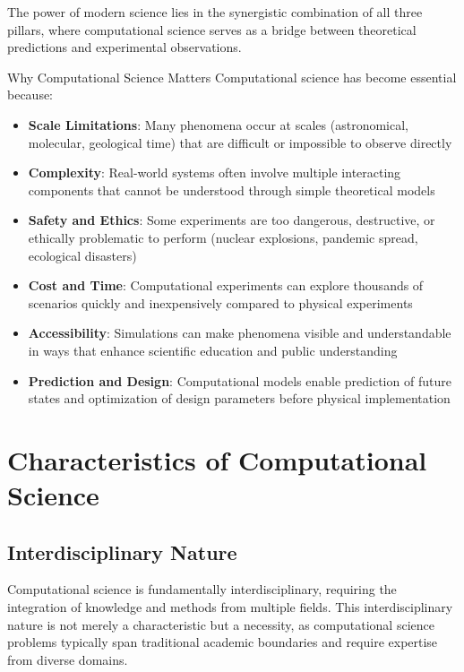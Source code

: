 The power of modern science lies in the synergistic combination of all three pillars, where computational science serves as a bridge between theoretical predictions and experimental observations.

\begin{highlightbox}{Why Computational Science Matters}
Computational science has become essential because:
\begin{itemize}
  \item \textbf{Scale Limitations}: Many phenomena occur at scales (astronomical, molecular, geological time) that are difficult or impossible to observe directly
  \item \textbf{Complexity}: Real-world systems often involve multiple interacting components that cannot be understood through simple theoretical models
  \item \textbf{Safety and Ethics}: Some experiments are too dangerous, destructive, or ethically problematic to perform (nuclear explosions, pandemic spread, ecological disasters)
  \item \textbf{Cost and Time}: Computational experiments can explore thousands of scenarios quickly and inexpensively compared to physical experiments
  \item \textbf{Accessibility}: Simulations can make phenomena visible and understandable in ways that enhance scientific education and public understanding
  \item \textbf{Prediction and Design}: Computational models enable prediction of future states and optimization of design parameters before physical implementation
\end{itemize}
\end{highlightbox}

\section{Characteristics of Computational Science}

\subsection{Interdisciplinary Nature}

Computational science is fundamentally interdisciplinary, requiring the integration of knowledge and methods from multiple fields. This interdisciplinary nature is not merely a characteristic but a necessity, as computational science problems typically span traditional academic boundaries and require expertise from diverse domains.

